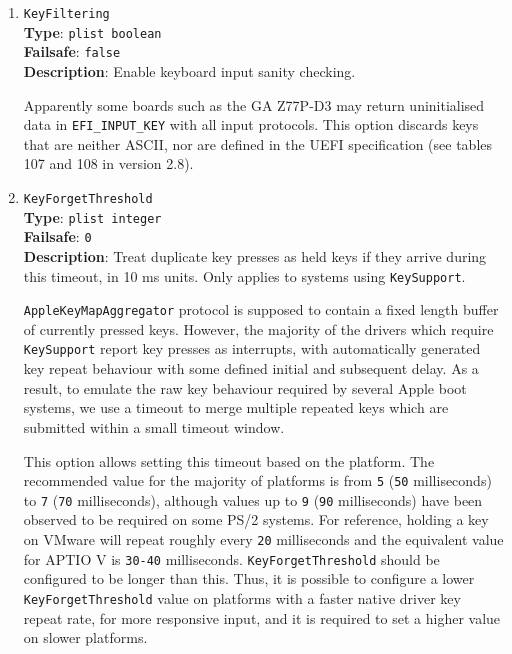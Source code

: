 \documentclass[]{article}
\begin{document}
\begin{enumerate}

\item
  \texttt{KeyFiltering}\\
  \textbf{Type}: \texttt{plist\ boolean}\\
  \textbf{Failsafe}: \texttt{false}\\
  \textbf{Description}: Enable keyboard input sanity checking.

  Apparently some boards such as the GA Z77P-D3 may return uninitialised data
  in \texttt{EFI\_INPUT\_KEY} with all input protocols.
  This option discards keys that are neither ASCII, nor are defined
  in the UEFI specification (see tables 107 and 108 in version 2.8).

\item
  \texttt{KeyForgetThreshold}\\
  \textbf{Type}: \texttt{plist\ integer}\\
  \textbf{Failsafe}: \texttt{0}\\
  \textbf{Description}: Treat duplicate key presses as held keys if they arrive
  during this timeout, in 10 ms units. Only applies to systems using \texttt{KeySupport}.

  \texttt{AppleKeyMapAggregator} protocol is supposed to contain a fixed length buffer
  of currently pressed keys. However, the majority of the drivers which require
  \texttt{KeySupport} report key presses as interrupts, with automatically generated
  key repeat behaviour with some defined initial and subsequent delay. As a result,
  to emulate the raw key behaviour required by several Apple boot systems, we use a
  timeout to merge multiple repeated keys which are submitted within a small timeout
  window.

  This option allows setting this timeout based on the platform. The recommended
  value for the majority of platforms is from \texttt{5} (\texttt{50} milliseconds)
  to \texttt{7} (\texttt{70} milliseconds), although values up to \texttt{9}
  (\texttt{90} milliseconds) have been observed to be required on some PS/2 systems.
  For reference, holding a key on VMware will repeat roughly every \texttt{20}
  milliseconds and the equivalent value for APTIO V is \texttt{30-40} milliseconds.
  \texttt{KeyForgetThreshold} should be configured to be longer than this. Thus,
  it is possible to configure a lower \texttt{KeyForgetThreshold} value on platforms
  with a faster native driver key repeat rate, for more responsive input, and it is
  required to set a higher value on slower platforms.


\end{enumerate}
\end{document}
